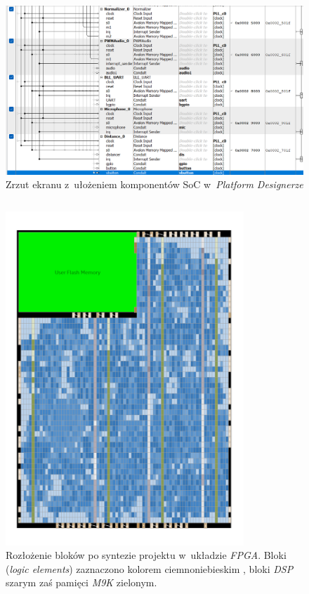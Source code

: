\documentclass[
    left=2.5cm,         %
    right=2.5cm,        %
    top=2.5cm,          %
    bottom=3cm,         %
    bindingoffset=6mm,  %
    nohyphenation=true %
]{eiti/eiti-thesis} %
\begin{document}
\begin{figure}[h]
	\centering
	\includegraphics[width=1\textwidth]{platform2.png}
	\caption{Zrzut ekranu z~ułożeniem komponentów SoC w~\textit{Platform Designerze}}
\end{figure}

\FloatBarrier %
$$$$
\newpage
{}
\FloatBarrier %
\begin{figure}[h]
	\centering
	\includegraphics[width=0.8\textwidth]{utilization.png}
	\caption{Rozłożenie bloków po syntezie projektu w~układzie \textit{FPGA}. Bloki (\textit{logic elements}) zaznaczono kolorem ciemnoniebieskim , bloki \textit{DSP} szarym zaś pamięci \textit{M9K} zielonym.}
\end{figure}
\FloatBarrier %
\newpage
\end{document}

